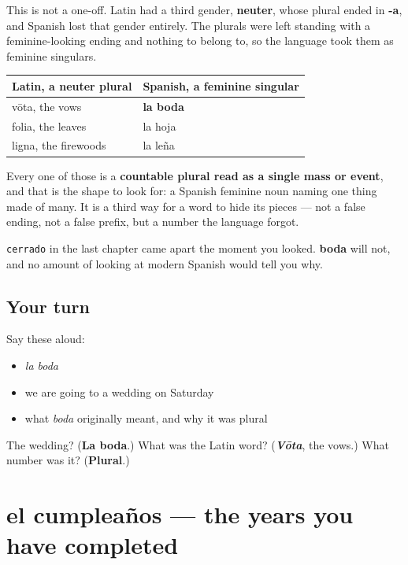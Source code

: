 \begin{culture}
This is not a one-off. Latin had a third gender, \textbf{neuter}, whose plural ended in \textbf{-a}, and Spanish lost that gender entirely. The plurals were left standing with a feminine-looking ending and nothing to belong to, so the language took them as feminine singulars.

\noindent
\begin{tabularx}{\linewidth}{@{}>{\raggedright\arraybackslash}X>{\raggedright\arraybackslash}X@{}}
\toprule
\textbf{Latin, a neuter plural} & \textbf{Spanish, a feminine singular} \\
\midrule
vōta, the vows & \textbf{la boda} \\
folia, the leaves & la hoja \\
ligna, the firewoods & la leña \\
\bottomrule
\end{tabularx}

Every one of those is a \textbf{countable plural read as a single mass or event}, and that is the shape to look for: a Spanish feminine noun naming one thing made of many. It is a third way for a word to hide its pieces — not a false ending, not a false prefix, but a number the language forgot.

\texttt{cerrado} in the last chapter came apart the moment you looked. \textbf{boda} will not, and no amount of looking at modern Spanish would tell you why.
\end{culture}

\subsection*{Your turn}
Say these aloud:

\begin{itemize}
\raggedright
  \item \emph{la boda}
  \item we are going to a wedding on Saturday
  \item what \emph{boda} originally meant, and why it was plural
\end{itemize}

\begin{tcolorbox}[breakable,colback=teal!4,colframe=teal!35!black,title={Before you move on}]
The wedding? (\textbf{La boda}.) What was the Latin word? (\emph{\textbf{Vōta}}, the vows.) What number was it? (\textbf{Plural}.)
\end{tcolorbox}
\section[el cumpleaños]{el cumpleaños — the years you have completed}

